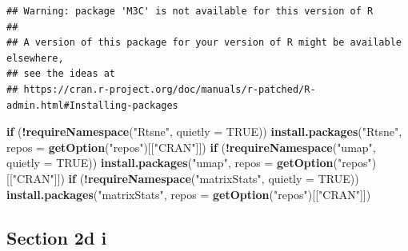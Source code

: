 \documentclass[
]{article}
\newenvironment{Shaded}{\begin{snugshade}}{\end{snugshade}}
\newcommand{\AttributeTok}[1]{\textcolor[rgb]{0.13,0.29,0.53}{#1}}
\newcommand{\ConstantTok}[1]{\textcolor[rgb]{0.56,0.35,0.01}{#1}}
\newcommand{\ControlFlowTok}[1]{\textcolor[rgb]{0.13,0.29,0.53}{\textbf{#1}}}
\newcommand{\FunctionTok}[1]{\textcolor[rgb]{0.13,0.29,0.53}{\textbf{#1}}}
\newcommand{\NormalTok}[1]{#1}
\newcommand{\SpecialCharTok}[1]{\textcolor[rgb]{0.81,0.36,0.00}{\textbf{#1}}}
\newcommand{\StringTok}[1]{\textcolor[rgb]{0.31,0.60,0.02}{#1}}
\begin{document}
\begin{verbatim}
## Warning: package 'M3C' is not available for this version of R
## 
## A version of this package for your version of R might be available elsewhere,
## see the ideas at
## https://cran.r-project.org/doc/manuals/r-patched/R-admin.html#Installing-packages
\end{verbatim}

\begin{Shaded}
\begin{Highlighting}[]
\ControlFlowTok{if}\NormalTok{ (}\SpecialCharTok{!}\FunctionTok{requireNamespace}\NormalTok{(}\StringTok{"Rtsne"}\NormalTok{, }\AttributeTok{quietly =} \ConstantTok{TRUE}\NormalTok{)) }\FunctionTok{install.packages}\NormalTok{(}\StringTok{"Rtsne"}\NormalTok{, }\AttributeTok{repos =} \FunctionTok{getOption}\NormalTok{(}\StringTok{"repos"}\NormalTok{)[[}\StringTok{"CRAN"}\NormalTok{]])}
\ControlFlowTok{if}\NormalTok{ (}\SpecialCharTok{!}\FunctionTok{requireNamespace}\NormalTok{(}\StringTok{"umap"}\NormalTok{, }\AttributeTok{quietly =} \ConstantTok{TRUE}\NormalTok{)) }\FunctionTok{install.packages}\NormalTok{(}\StringTok{"umap"}\NormalTok{, }\AttributeTok{repos =} \FunctionTok{getOption}\NormalTok{(}\StringTok{"repos"}\NormalTok{)[[}\StringTok{"CRAN"}\NormalTok{]])}
\ControlFlowTok{if}\NormalTok{ (}\SpecialCharTok{!}\FunctionTok{requireNamespace}\NormalTok{(}\StringTok{"matrixStats"}\NormalTok{, }\AttributeTok{quietly =} \ConstantTok{TRUE}\NormalTok{)) }\FunctionTok{install.packages}\NormalTok{(}\StringTok{"matrixStats"}\NormalTok{, }\AttributeTok{repos =} \FunctionTok{getOption}\NormalTok{(}\StringTok{"repos"}\NormalTok{)[[}\StringTok{"CRAN"}\NormalTok{]])}
\end{Highlighting}
\end{Shaded}

\subsection{Section 2d i}\label{section-2d-i}
\end{document}
